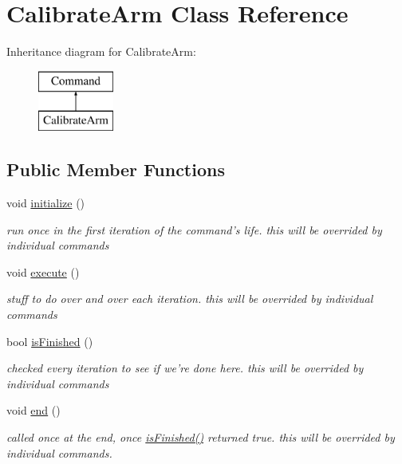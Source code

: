 \hypertarget{classCalibrateArm}{\section{Calibrate\-Arm Class Reference}
\label{classCalibrateArm}
}
Inheritance diagram for Calibrate\-Arm\-:\begin{figure}[H]
\begin{center}
\leavevmode
\includegraphics[height=2.000000cm]{classCalibrateArm}
\end{center}
\end{figure}
\subsection*{Public Member Functions}
\begin{DoxyCompactItemize}
\item 
\hypertarget{classCalibrateArm_acc9f34841c2ff2806338c3fe5a6d4cb6}{void \hyperlink{classCalibrateArm_acc9f34841c2ff2806338c3fe5a6d4cb6}{initialize} ()}\label{classCalibrateArm_acc9f34841c2ff2806338c3fe5a6d4cb6}

\begin{DoxyCompactList}\small\item\em run once in the first iteration of the command's life. this will be overrided by individual commands \end{DoxyCompactList}\item 
\hypertarget{classCalibrateArm_a931974eeaf4951b57b83219a905d89a7}{void \hyperlink{classCalibrateArm_a931974eeaf4951b57b83219a905d89a7}{execute} ()}\label{classCalibrateArm_a931974eeaf4951b57b83219a905d89a7}

\begin{DoxyCompactList}\small\item\em stuff to do over and over each iteration. this will be overrided by individual commands \end{DoxyCompactList}\item 
bool \hyperlink{classCalibrateArm_a1f0193e75d78560e076166b42603bc76}{is\-Finished} ()
\begin{DoxyCompactList}\small\item\em checked every iteration to see if we're done here. this will be overrided by individual commands \end{DoxyCompactList}\item 
\hypertarget{classCalibrateArm_a32c6c258858dde9a091e5fd0fa04c825}{void \hyperlink{classCalibrateArm_a32c6c258858dde9a091e5fd0fa04c825}{end} ()}\label{classCalibrateArm_a32c6c258858dde9a091e5fd0fa04c825}

\begin{DoxyCompactList}\small\item\em called once at the end, once \hyperlink{classCalibrateArm_a1f0193e75d78560e076166b42603bc76}{is\-Finished()} returned true. this will be overrided by individual commands. \end{DoxyCompactList}\end{DoxyCompactItemize}
